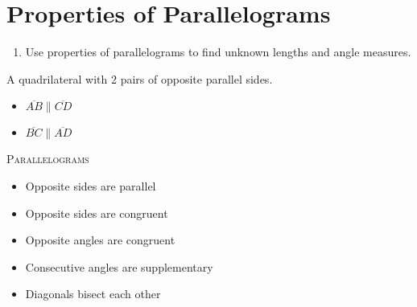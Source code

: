 \documentclass{article}
\begin{document}
\section*{Properties of Parallelograms}

\begin{tcolorbox}[colframe=orange!70!white, coltitle=black, title=\textbf{Today I Can}]
\begin{enumerate}
    \item Use properties of parallelograms to find unknown lengths and angle measures.
\end{enumerate}
\end{tcolorbox}
\bigskip 

\begin{tcolorbox}[colframe=black!20!white, opacitybacktitle=0.1, coltitle=black, title=\textbf{Parallelograms}]
A quadrilateral with 2 pairs of opposite parallel sides. \newline 

\begin{minipage}{0.5\textwidth}
\begin{itemize}
    \item $\overline{AB} \parallel \overline{CD}$
    \item $\overline{BC} \parallel \overline{AD}$
\end{itemize}
\end{minipage}
\begin{minipage}{0.4\textwidth}
\end{minipage}
\end{tcolorbox}

\textsc{Parallelograms} 

\begin{itemize}
    \item Opposite sides are parallel
    \item Opposite sides are congruent
    \item Opposite angles are congruent
    \item Consecutive angles are supplementary
    \item Diagonals bisect each other
\end{itemize}
\end{document}
